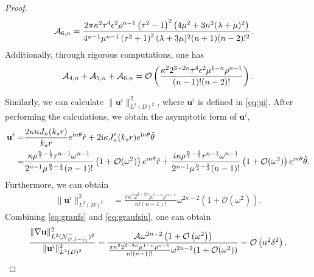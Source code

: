 \documentclass[11pt,reqno,twoside]{amsart}
\theoremstyle{definition}
\theoremstyle{remark}
\numberwithin{equation}{section}
\newcommand{\bu}{\mathbf{u}}
\newcommand{\bx}{\mathbf{x}}
\begin{document}
\begin{proof}
\begin{align}
				\mathcal{A}_{6,n}&=\frac{2\pi\kappa^2  \tau ^4 \epsilon ^2  \rho ^{n-1}  \left(\tau ^2-1\right)^2 \left(4 \mu ^2+3 n^2 (\lambda +\mu )^2\right)}{4^{n-1}\mu ^{n-1}\left(\tau ^2+1\right)^2 (\lambda +3 \mu )^2 (n+1) (n-2)!^2}.\notag
			\end{align}
			Additionally, through rigorous computations, one has
			\begin{align}
				\mathcal{A}_{4,n}+\mathcal{A}_{5,n}+\mathcal{A}_{6,n}=\mathcal{O}\left(\frac{\kappa^2 2^{3-2 n} \tau ^4 \epsilon ^2 \mu ^{1-n} \rho ^{n-1} }{(n-1)!   (n-2)!}\right).\notag
			\end{align}
			
			
			Similarly, we can calculate $\|\bu^i\|_{L^2(D)^2}^2$, where $\bu^i$ is defined in \eqref{eq:ui}. After performing the calculations, we obtain the asymptotic form of $\bu^i$,
			\begin{align}
				\bu^i=&\frac{2\kappa nJ_{n}(k_{s}r)}{k_{s}r}e^{\mathrm{i}n\theta}\hat{r}+2\mathrm{i}\kappa J_{n}^{\prime}(k_{s}r)e^{\mathrm{i}n\theta}\hat{\theta}\notag\\
				=&\frac{\kappa     \rho ^{\frac{n}{2}-\frac{1}{2}} r^{n-1} \omega ^{n-1}}{2^{n-1}\mu ^{\frac{n}{2}-\frac{1}{2}}(n-1)!}\left(1+\mathcal{O}(\omega^2)\right)e^{\mathrm{i}n\theta}\hat{r}+\frac{i \kappa    \rho ^{\frac{n}{2}-\frac{1}{2}} r^{n-1} \omega ^{n-1}}{2^{n-1}\mu ^{\frac{n}{2}-\frac{1}{2}}(n-1)!}\left(1+\mathcal{O}(\omega^2)\right)e^{\mathrm{i}n\theta}\hat{\theta}.\notag
			\end{align}
			Furthermore, we can obtain
			\begin{align}
				\|\bu^{i}\|_{L^{2}(D)^2 }^{2}
				&=  \frac{\pi\kappa ^2 2^{3-2 n} \mu ^{1-n} \rho ^{n-1} }{n!(n-1)!}\omega^{2n-2}(1+\mathcal{O}(\omega ^2 )).\label{eq:graufsiu}
			\end{align}
			Combining \eqref{eq:graufs} and \eqref{eq:graufsiu}, one can obtain 
			\begin{align}\notag
				\frac{\|\nabla\mathbf{u}\|_{L^2(\mathcal{N}_{D,1-\gamma_{1}}^{-})^2}^2}{\|{\bu}^i\|_{L^2(D)^2}^2}=\frac{\mathcal{A}\omega^{2n-2}\left(1+\mathcal{O}\left(\omega^2\right)\right)}{ \frac{\pi\kappa ^2 2^{3-2 n} \mu ^{1-n} \rho ^{n-1} }{n!(n-1)!}\omega^{2n-2}(1+\mathcal{O}(\omega ^2 ))}=\mathcal{O}\left(n^2\delta^2\right).
			\end{align}  
			

\end{proof}
\end{document}
